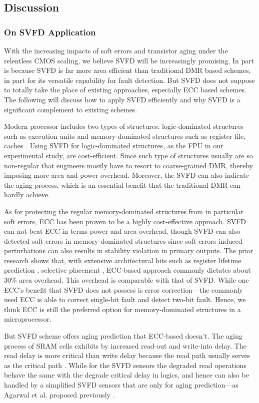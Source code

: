 \subsection{Discussion}
\subsubsection{On SVFD Application}
With the increasing impacts of soft errors and transistor aging under the relentless CMOS scaling, we believe SVFD will be increasingly promising. In part is because SVFD is far more area efficient than traditional DMR based schemes, in part for its versatile capability for fault detection. But SVFD does not suppose to totally take the place of existing approaches, especially ECC based schemes.  The following will discuss how to apply SVFD efficiently and why SVFD is a significant complement to existing schemes.

Modern processor includes two types of structures: logic-dominated structures such as execution units and memory-dominated structures such as register file, caches \cite{Revival_08}. Using  SVFD for logic-dominated structures, as the FPU in our experimental study, are cost-efficient. Since such type of structures usually are so non-regular that engineers mostly have to resort to coarse-grained DMR, thereby imposing more area and power overhead. Moreover, the SVFD can also indicate the aging process, which is an essential benefit that the traditional DMR can hardly achieve.

As for protecting the regular memory-dominated structures from in particular soft errors, ECC has been proven to be a highly cost-effective approach. SVFD can not beat ECC in terms power and area overhead, though SVFD can also detected soft errors in memory-dominated structures since soft errors induced perturbations can also results in stability violation in primary outputs. The prior research shows that, with extensive architectural hits such as register lifetime prediction \cite{Using_Register_Lifetime_dsn07}, selective placement \cite{Exploiting_selective_placement_taco08}, ECC-based approach commonly dictates about 30\% area overhead. This overhead is comparable with that of SVFD. While one ECC's benefit that SVFD does not possess is error correction---the commonly used ECC is able to correct single-bit fault and detect two-bit fault. Hence, we think ECC is still the preferred option for memory-dominated structures in a microprocessor.

But SVFD scheme offers aging prediction that ECC-based doesn't. The aging process of SRAM cells exhibits by increased read-out and write-into delay. The read delay is more critical than write delay because the read path usually serves as the critical path \cite{Mitigating_Parameter_Variation_micro07}. While for the SVFD sensors the degraded read operations behave the same with the degrade critical delay in logics, and hence can also be handled by a simplified SVFD sensors that are only for aging prediction---as Agarwal et al. proposed previously \cite{failure_prediction_07}.

